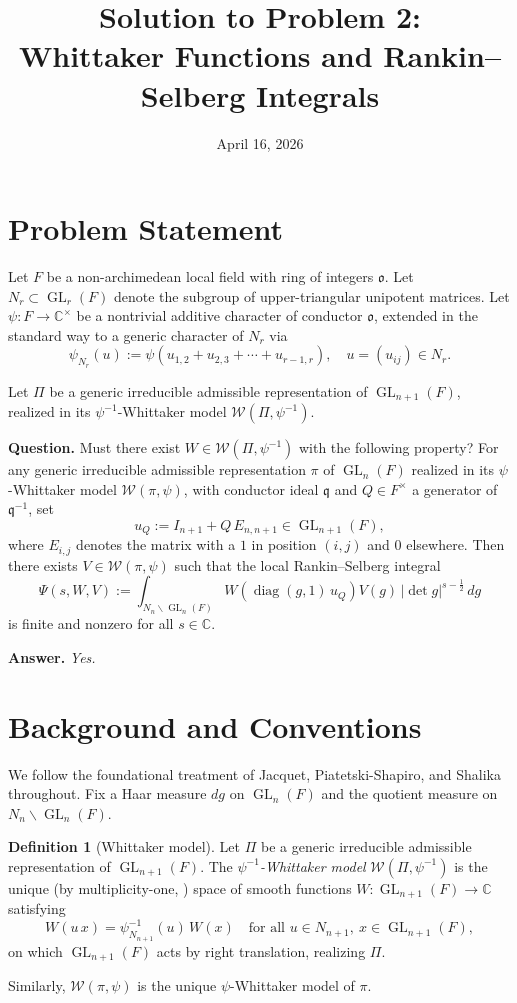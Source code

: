 \documentclass[12pt]{article}
\title{Solution to Problem 2:\\
  Whittaker Functions and Rankin--Selberg Integrals}
\author{}
\date{April 16, 2026}
\theoremstyle{definition}
\newtheorem{definition}[theorem]{Definition}
\DeclareMathOperator{\diag}{diag}
\DeclareMathOperator{\GL}{GL}
\begin{document}
\maketitle

\section*{Problem Statement}

Let $F$ be a non-archimedean local field with ring of integers $\mathfrak{o}$.
Let $N_r \subset \GL_r(F)$ denote the subgroup of upper-triangular unipotent matrices.
Let $\psi \colon F \to \mathbb{C}^\times$ be a nontrivial additive character of conductor
$\mathfrak{o}$, extended in the standard way to a generic character of $N_r$ via
\[
  \psi_{N_r}(u) := \psi(u_{1,2} + u_{2,3} + \cdots + u_{r-1,r}), \quad u = (u_{ij}) \in N_r.
\]

Let $\Pi$ be a generic irreducible admissible representation of $\GL_{n+1}(F)$, realized
in its $\psi^{-1}$-Whittaker model $\mathcal{W}(\Pi, \psi^{-1})$.

\medskip

\noindent \textbf{Question.} Must there exist $W \in \mathcal{W}(\Pi, \psi^{-1})$ with the
following property? For any generic irreducible admissible representation $\pi$ of $\GL_n(F)$
realized in its $\psi$-Whittaker model $\mathcal{W}(\pi, \psi)$, with conductor ideal
$\mathfrak{q}$ and $Q \in F^\times$ a generator of $\mathfrak{q}^{-1}$, set
\[
  u_Q := I_{n+1} + Q\,E_{n,n+1} \in \GL_{n+1}(F),
\]
where $E_{i,j}$ denotes the matrix with a $1$ in position $(i,j)$ and $0$ elsewhere.
Then there exists $V \in \mathcal{W}(\pi, \psi)$ such that the local Rankin--Selberg integral
\[
  \Psi(s, W, V) := \int_{N_n \backslash \GL_n(F)}
    W\!\left(\diag(g, 1)\, u_Q\right) V(g)\, |\det g|^{s - \frac{1}{2}}\, dg
\]
is finite and nonzero for all $s \in \mathbb{C}$.

\medskip

\noindent \textbf{Answer.} \emph{Yes.}

\section*{Background and Conventions}

We follow the foundational treatment of Jacquet, Piatetski-Shapiro, and Shalika
\cite{JPSS83} throughout. Fix a Haar measure $dg$ on $\GL_n(F)$ and the quotient
measure on $N_n \backslash \GL_n(F)$.

\begin{definition}[Whittaker model]
  Let $\Pi$ be a generic irreducible admissible representation of $\GL_{n+1}(F)$.
  The \emph{$\psi^{-1}$-Whittaker model} $\mathcal{W}(\Pi, \psi^{-1})$ is the unique
  (by multiplicity-one, \cite[Theorem 3.1]{JPSS83}) space of smooth functions
  $W \colon \GL_{n+1}(F) \to \mathbb{C}$ satisfying
  \[
    W(u\, x) = \psi^{-1}_{N_{n+1}}(u)\, W(x)
    \quad \text{for all } u \in N_{n+1},\ x \in \GL_{n+1}(F),
  \]
  on which $\GL_{n+1}(F)$ acts by right translation, realizing $\Pi$.

  Similarly, $\mathcal{W}(\pi, \psi)$ is the unique $\psi$-Whittaker model of $\pi$.
\end{definition}
\end{document}
